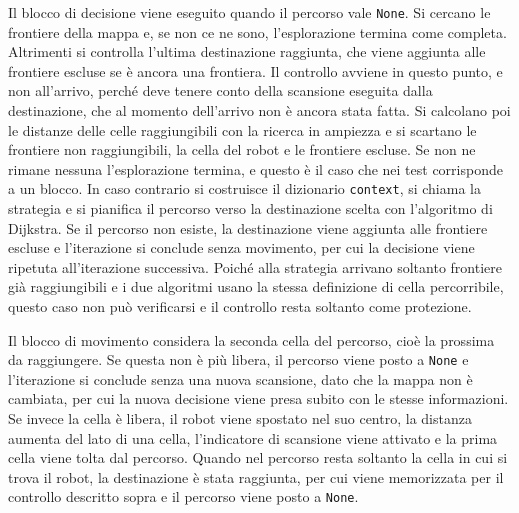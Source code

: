 Il blocco di decisione viene eseguito quando il percorso vale \texttt{None}. Si cercano le frontiere della mappa e, se non ce ne sono, l'esplorazione termina come completa. Altrimenti si controlla l'ultima destinazione raggiunta, che viene aggiunta alle frontiere escluse se è ancora una frontiera. Il controllo avviene in questo punto, e non all'arrivo, perché deve tenere conto della scansione eseguita dalla destinazione, che al momento dell'arrivo non è ancora stata fatta. Si calcolano poi le distanze delle celle raggiungibili con la ricerca in ampiezza e si scartano le frontiere non raggiungibili, la cella del robot e le frontiere escluse. Se non ne rimane nessuna l'esplorazione termina, e questo è il caso che nei test corrisponde a un blocco. In caso contrario si costruisce il dizionario \texttt{context}, si chiama la strategia e si pianifica il percorso verso la destinazione scelta con l'algoritmo di Dijkstra. Se il percorso non esiste, la destinazione viene aggiunta alle frontiere escluse e l'iterazione si conclude senza movimento, per cui la decisione viene ripetuta all'iterazione successiva. Poiché alla strategia arrivano soltanto frontiere già raggiungibili e i due algoritmi usano la stessa definizione di cella percorribile, questo caso non può verificarsi e il controllo resta soltanto come protezione.

Il blocco di movimento considera la seconda cella del percorso, cioè la prossima da raggiungere. Se questa non è più libera, il percorso viene posto a \texttt{None} e l'iterazione si conclude senza una nuova scansione, dato che la mappa non è cambiata, per cui la nuova decisione viene presa subito con le stesse informazioni. Se invece la cella è libera, il robot viene spostato nel suo centro, la distanza aumenta del lato di una cella, l'indicatore di scansione viene attivato e la prima cella viene tolta dal percorso. Quando nel percorso resta soltanto la cella in cui si trova il robot, la destinazione è stata raggiunta, per cui viene memorizzata per il controllo descritto sopra e il percorso viene posto a \texttt{None}.

